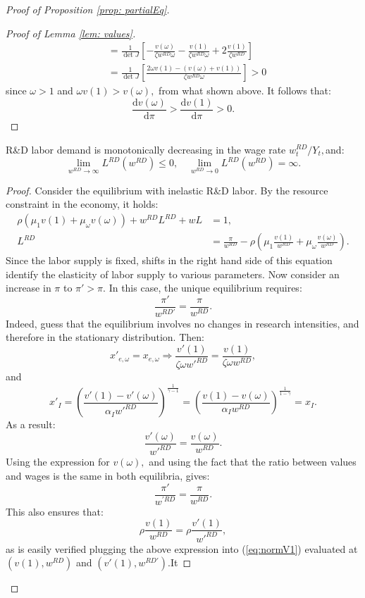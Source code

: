 \begin{proof}[Proof of Proposition \ref{prop: partialEq}]
\begin{proof}[Proof of Lemma \ref{lem: values}]
\begin{align}
 & =\frac{1}{\det J}\left[-\frac{v(\omega)}{\zeta w^{RD}\omega}-\frac{v(1)}{\zeta w^{RD}\omega}+2\frac{v(1)}{\zeta w^{RD}}\right]\nonumber \\
 & =\frac{1}{\det J}\left[\frac{2\omega v(1)-\left(v(\omega)+v(1)\right)}{\zeta w^{RD}\omega}\right]>0\label{eq:diffVal}
\end{align}
since $\omega>1$ and $\omega v(1)>v(\omega),$ from what shown above.
It follows that: 
\[
\frac{\mathrm{d}v(\omega)}{\mathrm{d}\pi}>\frac{\mathrm{d}v(1)}{\mathrm{d}\pi}>0.
\]
 

\end{proof}
\begin{lem}
\label{lem:Labor Demand}R\&D labor demand is monotonically decreasing
in the wage rate $w_{t}^{RD}/Y_{t},$and:
\[
\lim_{w^{RD}\rightarrow\infty}L^{RD}(w^{RD})\leq0,\quad\lim_{w^{RD}\rightarrow0}L^{RD}(w^{RD})=\infty.
\]
\end{lem}
\begin{proof}
Consider the equilibrium with inelastic R\&D labor. By the resource
constraint in the economy, it holds:
\begin{align*}
\rho\left(\mu_{1}v(1)+\mu_{\omega}v(\omega)\right)+w^{RD}L^{RD}+wL & =1,\\
L^{RD} & =\frac{\pi}{w^{RD}}-\rho\left(\mu_{1}\frac{v(1)}{w^{RD}}+\mu_{\omega}\frac{v(\omega)}{w^{RD}}\right).
\end{align*}
Since the labor supply is fixed, shifts in the right hand side of
this equation identify the elasticity of labor supply to various parameters.
Now consider an increase in $\pi$ to $\pi'>\pi$. In this case, the
unique equilibrium requires:
\[
\frac{\pi'}{w^{RD\prime}}=\frac{\pi}{w^{RD}}.
\]
Indeed, guess that the equilibrium involves no changes in research
intensities, and therefore in the stationary distribution. Then:
\[
x'_{e,\omega}=x_{e,\omega}\Rightarrow\frac{v'(1)}{\zeta\omega w'^{RD}}=\frac{v(1)}{\zeta\omega w{}^{RD}},
\]
and
\[
x'_{I}=\left(\frac{v'(1)-v'(\omega)}{\alpha_{I}w'^{RD}}\right)^{\frac{1}{\gamma-1}}=\left(\frac{v(1)-v(\omega)}{\alpha_{I}w{}^{RD}}\right)^{\frac{1}{1-\gamma}}=x_{I}.
\]
As a result:
\[
\frac{v'(\omega)}{w'^{RD}}=\frac{v(\omega)}{w^{RD}}.
\]
Using the expression for $v(\omega),$ and using the fact that the
ratio between values and wages is the same in both equilibria, gives:
\[
\frac{\pi'}{w^{\prime RD}}=\frac{\pi}{w^{RD}}.
\]
This also ensures that:
\[
\rho\frac{v(1)}{w^{RD}}=\rho\frac{v'(1)}{w'^{RD}},
\]
 as is easily verified plugging the above expression into (\ref{eq:normV1})
evaluated at $\left(v(1),w^{RD}\right)$ and $\left(v'(1),w^{RD\prime}\right).$It

\end{proof}
\end{proof}
